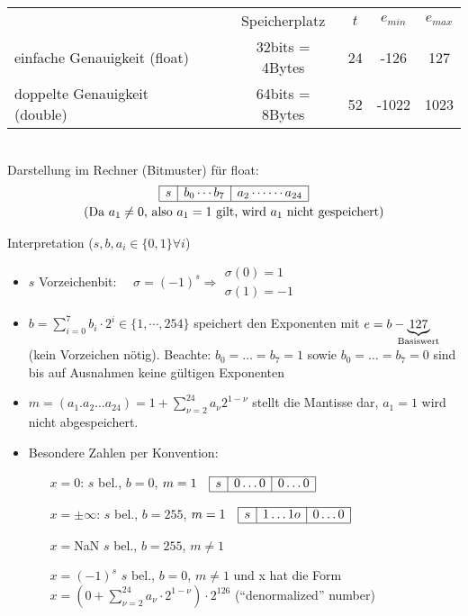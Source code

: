 \begin{tabular}{l@{}cccc@{}}
  & Speicherplatz & $t$ & $e_{min}$ & $e_{max}$ \\
  \cmidrule{2-5}
  einfache Genauigkeit (float) \index{floating point} & 32bits = 4Bytes & 24 &-126 & 127 \\
  doppelte  Genauigkeit (double)~~\index{double} & 64bits = 8Bytes& 52 & -1022 & 1023
\end{tabular}\\

Darstellung im Rechner (Bitmuster) für float:
\begin{gather*}
  \floatbox{s}{b_0\cdots b_7}{a_2\cdots\cdots a_{24}}\\
  \text{(Da $a_1\neq 0$, also $a_1=1$ gilt, wird $a_1$ nicht gespeichert)}
\end{gather*}

Interpretation ($s,b,a_i\in\{0,1\} \forall i$)
\begin{itemize}
\item $s$ Vorzeichenbit: 
  $\quad \sigma=(-1)^s\Rightarrow 
  \begin{array}{l}
    \sigma(0)=1 \\
    \sigma(1)=-1
  \end{array} $
\item $b=\sum_{i=0}^{7}b_i\cdot2^i \in \{1, \cdots, 254\}$ 
  speichert den Exponenten mit 
  $e = b-\underbrace{127}_{\mathclap{\text{Basiswert}}}$ (kein Vorzeichen nötig).
  Beachte: $b_0=\dotso=b_7=1$ sowie $b_0=\dotso=b_7=0$ sind bis auf Ausnahmen keine gültigen Exponenten
\item $m=(a_1.a_2\dotso a_{24})=1+\sum_{\nu=2}^{24}a_{\nu}2^{1-\nu}$ stellt die Mantisse dar, $a_1=1$ wird nicht abgespeichert.
\item Besondere Zahlen per Konvention:
  \begin{itemize}
  \item[$x=0$:] $s$ bel., $b=0$, $m=1 \quad \floatbox{s}{0\dotso0}{0\dotso0}$
  \item[$x=\pm\infty$:]  $s$ bel., $b=255$, $m=1  \quad \floatbox{s}{1\dots1o}{0\dotso0}$
  \item[$x=$NaN] $s$ bel., $b=255$, $m\neq 1$
  \item[$x=(-1)^s$] $s$ bel., $b=0$, $m\neq 1$ und x hat die Form $x=(0+\sum_{\nu=2}^{24}a_{\nu}\cdot 2^{1-\nu})\cdot 2^{126}$ (\enquote{denormalized} number)
  \end{itemize}
\end{itemize}

